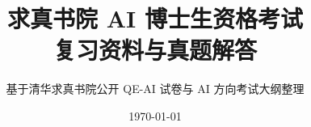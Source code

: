 

\title{\bfseries 求真书院 AI 博士生资格考试\\复习资料与真题解答}
\author{基于清华求真书院公开 QE-AI 试卷与 AI 方向考试大纲整理}
\date{\today}



\nocite{qzc-resource,qzc-ai-2025-spring,qzc-ai-2025-fall,qzc-ai-2026-spring,qzc-ai-syllabus-2026}

\frontmatter
\maketitle
\tableofcontents

\mainmatter











\backmatter
\printbibliography[heading=bibintoc,title={参考文献与官方来源}]


